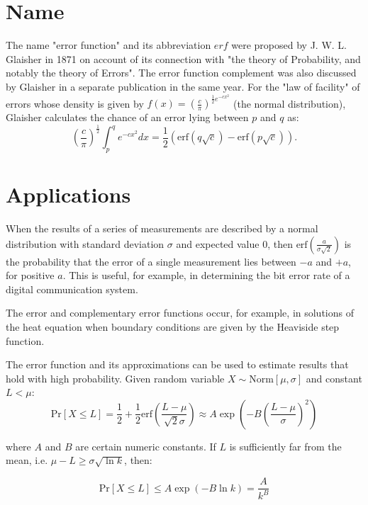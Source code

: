 \documentclass{article}
\begin{document}
\section{Name}


The name "error function" and its abbreviation $erf$ were proposed by J. W. L. Glaisher in 1871 on account of its connection with "the theory of Probability, and notably the theory of Errors". The error function complement was also discussed by Glaisher in a separate publication in the same year. For the "law of facility" of errors whose density is given by $f(x)=\left(\frac{c}{\pi}\right)^{\frac{1}{2}e^{-cx^2}} $ (the normal distribution), Glaisher calculates the chance of an error lying between $p$ and $q$ as:
\begin{equation}
\left(\frac{c}{\pi}\right)^{\frac{1}{2}} \int_p^qe^{-cx^2}dx =\frac{1}{2}\left(\mathrm{erf} (q\sqrt{c}) -\mathrm{erf} (p\sqrt{c})\right)\mathrm{.}
\end{equation}

\section{Applications}

When the results of a series of measurements are described by a  normal distribution with standard deviation  $\sigma$ and expected value $0$, then $\mathrm{erf}\left(\frac{a}{\sigma \sqrt{2}}\right)$  is the probability that the error of a single measurement lies between $-a$ and $+a$, for positive $a$. This is useful, for example, in determining the bit error rate of a digital communication system.

The error and complementary error functions occur, for example, in solutions of the heat equation when boundary conditions are given by the Heaviside step function.

The error function and its approximations can be used to estimate results that hold with high probability. Given random variable $X \sim \mathrm{Norm}[\mu,\sigma]$ and constant $L<\mu$:
\begin{equation}
\mathrm{Pr}[X\leq L] = \frac{1}{2} + \frac{1}{2}\mathrm{erf}\left(\frac{L-\mu}{\sqrt{2}\sigma}\right) \approx A \exp \left(-B \left(\frac{L-\mu}{\sigma}\right)^2\right)
\end{equation}

where $A$ and $B$ are certain numeric constants. If $L$ is sufficiently far from the mean, i.e.   $\mu -L \geq \sigma\sqrt{\ln{k}}$, then:

\begin{equation}
\mathrm{Pr}[X\leq L] \leq A \exp (-B \ln{k}) = \frac{A}{k^B}
\end{equation}
\end{document}
